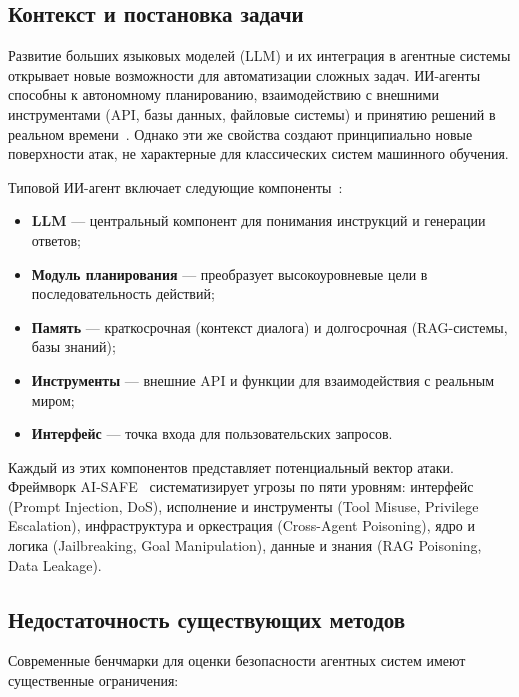 \documentclass{article}
\begin{document}
\subsection{Контекст и постановка задачи}

Развитие больших языковых моделей (LLM) и их интеграция в агентные системы открывает новые возможности для автоматизации сложных задач. ИИ-агенты способны к автономному планированию, взаимодействию с внешними инструментами (API, базы данных, файловые системы) и принятию решений в реальном времени~\cite{ai_safe_2025}. Однако эти же свойства создают принципиально новые поверхности атак, не характерные для классических систем машинного обучения.

Типовой ИИ-агент включает следующие компоненты~\cite{ai_safe_2025}:
\begin{itemize}
    \item \textbf{LLM} --- центральный компонент для понимания инструкций и генерации ответов;
    \item \textbf{Модуль планирования} --- преобразует высокоуровневые цели в последовательность действий;
    \item \textbf{Память} --- краткосрочная (контекст диалога) и долгосрочная (RAG-системы, базы знаний);
    \item \textbf{Инструменты} --- внешние API и функции для взаимодействия с реальным миром;
    \item \textbf{Интерфейс} --- точка входа для пользовательских запросов.
\end{itemize}

Каждый из этих компонентов представляет потенциальный вектор атаки. Фреймворк AI-SAFE~\cite{ai_safe_2025} систематизирует угрозы по пяти уровням: интерфейс (Prompt Injection, DoS), исполнение и инструменты (Tool Misuse, Privilege Escalation), инфраструктура и оркестрация (Cross-Agent Poisoning), ядро и логика (Jailbreaking, Goal Manipulation), данные и знания (RAG Poisoning, Data Leakage).

\subsection{Недостаточность существующих методов}

Современные бенчмарки для оценки безопасности агентных систем имеют существенные ограничения:
\end{document}

